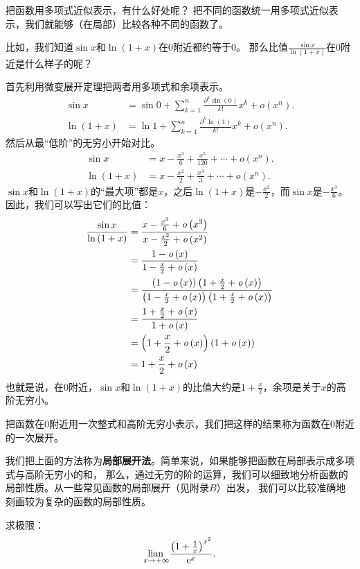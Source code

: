 \documentclass[12pt,UTF8,fontset=none]{ctexbook}
\begin{document}
把函数用多项式近似表示，有什么好处呢？
把不同的函数统一用多项式近似表示，我们就能够（在局部）比较各种不同的函数了。

比如，我们知道$\sin{x}$和$\ln{(1+x)}$在$0$附近都约等于$0$。
那么比值$\frac{\sin{x}}{\ln{(1 + x)}}$在$0$附近是什么样子的呢？

首先利用微变展开定理把两者用多项式和余项表示。
\begin{align*}
    \sin{x} &= \sin{0} + \sum_{k=1}^n \frac{\partial^k \sin (0)}{k!}x^k + \mathit{o}(x^n).  \\
    \ln{(1 + x)} &= \ln{1} + \sum_{k=1}^n \frac{\partial^k \ln (1)}{k!}x^k + \mathit{o}(x^n).  
\end{align*}
然后从最“低阶”的无穷小开始对比。
\begin{align*}
    \sin{x} &= x - \frac{x^3}{6} + \frac{x^5}{120} + \cdots + \mathit{o}(x^n).  \\
    \ln{(1 + x)} &= x - \frac{x^2}{2} + \frac{x^3}{3} + \cdots + \mathit{o}(x^n). 
\end{align*}
$\sin{x}$和$\ln{(1+x)}$的“最大项”都是$x$，之后$\ln{(1+x)}$是$- \frac{x^2}{2}$，而$\sin{x}$是$- \frac{x^3}{6}$。
因此，我们可以写出它们的比值：
\begin{align*}
    \frac{\sin{x}}{\ln{(1 + x)}} &= \frac{x - \frac{x^3}{6} + \mathit{o}\left(x^3\right)}{x - \frac{x^2}{2} + \mathit{o}\left(x^2\right)}  \\
    &= \frac{1 - \mathit{o}\left(x\right)}{1 - \frac{x}{2} + \mathit{o}\left(x\right)}  \\
    &= \frac{(1 - \mathit{o}\left(x\right))\left(1 + \frac{x}{2} + \mathit{o}\left(x\right)\right)}{\left(1 - \frac{x}{2} + \mathit{o}\left(x\right)\right)\left(1 + \frac{x}{2} + \mathit{o}\left(x\right)\right)}  \\
    &= \frac{1 + \frac{x}{2} + \mathit{o}\left(x\right)}{1 + \mathit{o}\left(x\right)}  \\
    &= \left(1 + \frac{x}{2} + \mathit{o}\left(x\right)\right)(1 + \mathit{o}\left(x\right))  \\
    &= 1 + \frac{x}{2} + \mathit{o}\left(x\right) 
\end{align*}
也就是说，在$0$附近，$\sin{x}$和$\ln{(1+x)}$的比值大约是$1 + \frac{x}{2}$，余项是关于$x$的高阶无穷小。

把函数在$0$附近用一次整式和高阶无穷小表示，我们把这样的结果称为函数在$0$附近的一次展开。

我们把上面的方法称为\textbf{局部展开法}。简单来说，如果能够把函数在局部表示成多项式与高阶无穷小的和，
那么，通过无穷的阶的运算，我们可以细致地分析函数的局部性质。从一些常见函数的局部展开（见附录$B$）出发，
我们可以比较准确地刻画较为复杂的函数的局部性质。

\begin{et}
    求极限：
    $$ \underset{x\to +\infty}{\operatorname{lian}\,} \frac{\left(1 + \frac{1}{x}\right)^{x^2}}{\mathrm{e}^x}.$$
\end{et}
\end{document}
